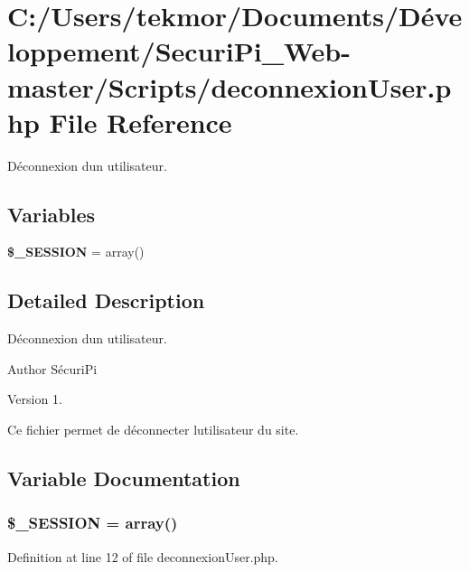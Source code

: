 \section{C\+:/\+Users/tekmor/\+Documents/\+Développement/\+Securi\+Pi\+\_\+\+Web-\/master/\+Scripts/deconnexion\+User.php File Reference}
\label{deconnexion_user_8php}


D\'{e}connexion d\textquotesingle{}un utilisateur.  


\subsection*{Variables}
\begin{DoxyCompactItemize}
\item 
{\bf \$\+\_\+\+S\+E\+S\+S\+I\+O\+N} = array()
\end{DoxyCompactItemize}


\subsection{Detailed Description}
D\'{e}connexion d\textquotesingle{}un utilisateur. 

\begin{DoxyAuthor}{Author}
S\'{e}curi\+Pi 
\end{DoxyAuthor}
\begin{DoxyVersion}{Version}
1.
\end{DoxyVersion}
Ce fichier permet de d\'{e}connecter l\textquotesingle{}utilisateur du site. 

\subsection{Variable Documentation}
\subsubsection[{\$\+\_\+\+S\+E\+S\+S\+I\+O\+N}]{\setlength{\rightskip}{0pt plus 5cm}\$\+\_\+\+S\+E\+S\+S\+I\+O\+N = array()}\label{deconnexion_user_8php_a5f545b9684799a00f7a14442205b98e3}


Definition at line 12 of file deconnexion\+User.\+php.

